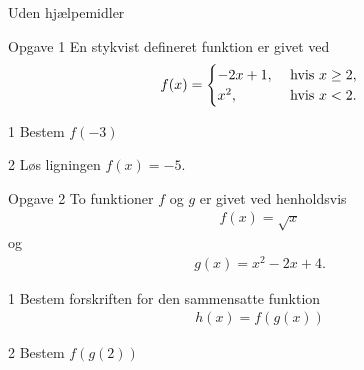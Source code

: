 \begin{center}
	\LARGE Uden hjælpemidler
\end{center}
\begin{opgavetekst}{Opgave 1}
	En stykvist defineret funktion er givet ved
	\begin{align*}
		f(x) = \begin{cases}
			-2x + 1, &\textnormal{ hvis } x \geq 2,\\
			x^2, &\textnormal{ hvis } x < 2.
		\end{cases}
	\end{align*}
\end{opgavetekst}
\begin{delopgave}{}{1}
	Bestem $f(-3)$
\end{delopgave}
\begin{delopgave}{}{2}
	Løs ligningen $f(x) = -5$.
\end{delopgave}
\begin{opgavetekst}{Opgave 2}
	To funktioner $f$ og $g$ er givet ved henholdsvis
	\begin{align*}
		f(x) = \sqrt{x}
	\end{align*}
	og
	\begin{align*}
		g(x) = x^2-2x+4.
	\end{align*}
\end{opgavetekst}
\begin{delopgave}{}{1}
	Bestem forskriften for den sammensatte funktion
	\begin{align*}
		h(x) = f(g(x))
	\end{align*}
\end{delopgave}
\begin{delopgave}{}{2}
	Bestem $f(g(2))$
\end{delopgave}
